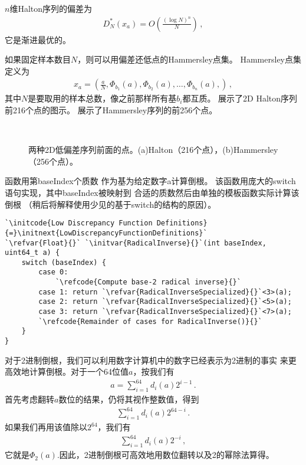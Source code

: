 $n$维Halton序列的偏差为
\begin{align*}
    D^*_N(x_a)=O\left(\frac{(\log N)^n}{N}\right)\, ,
\end{align*}
它是渐进最优的。

如果固定样本数目$N$，则可以用偏差还低点的Hammersley点集。
Hammersley点集定义为
\begin{align*}
    x_a=\left(\frac{a}{N},\varPhi_{b_1}(a),\varPhi_{b_2}(a),\ldots,\varPhi_{b_n}(a),\right)\, ,
\end{align*}
其中$N$是要取用的样本总数，像之前那样所有基$b_i$都互质。
展示了2D Halton序列前216个点的图示。
展示了Hammersley序列的前256个点。
\begin{figure}[htbp]
    \centering
    \,
    \caption{两种2D低偏差序列前面的点。(a)Halton（216个点），(b)Hammersley（256个点）。}
    \label{fig:7.25}
\end{figure}

函数用第{\ttfamily baseIndex}个质数
作为基为给定数字{\ttfamily a}计算倒根。
该函数用庞大的{\ttfamily switch}语句实现，其中{\ttfamily baseIndex}被映射到
合适的质数然后由单独的模板函数实际计算该倒根
（稍后将解释使用少见的基于{\ttfamily switch}的结构的原因）。
\begin{lstlisting}
`\initcode{Low Discrepancy Function Definitions}{=}\initnext{LowDiscrepancyFunctionDefinitions}`
`\refvar{Float}{}` `\initvar{RadicalInverse}{}`(int baseIndex, uint64_t a) {
    switch (baseIndex) {
        case 0:
            `\refcode{Compute base-2 radical inverse}{}`
        case 1: return `\refvar{RadicalInverseSpecialized}{}`<3>(a);
        case 2: return `\refvar{RadicalInverseSpecialized}{}`<5>(a);
        case 3: return `\refvar{RadicalInverseSpecialized}{}`<7>(a);
        `\refcode{Remainder of cases for RadicalInverse()}{}`
    }
}
\end{lstlisting}

对于2进制倒根，我们可以利用数字计算机中的数字已经表示为2进制的事实
来更高效地计算倒根。对于一个64位值$a$，按我们有
\begin{align*}
    a=\sum\limits_{i=1}^{64}{d_i(a)2^{i-1}}\, .
\end{align*}
首先考虑翻转$a$数位的结果，仍将其视作整数值，得到
\begin{align*}
    \sum\limits_{i=1}^{64}{d_i(a)2^{64-i}}\, .
\end{align*}
如果我们再用该值除以$2^{64}$，我们有
\begin{align*}
    \sum\limits_{i=1}^{64}{d_i(a)2^{-i}}\, ,
\end{align*}
它就是$\varPhi_2(a)$.因此，2进制倒根可高效地用数位翻转以及2的幂除法算得。

